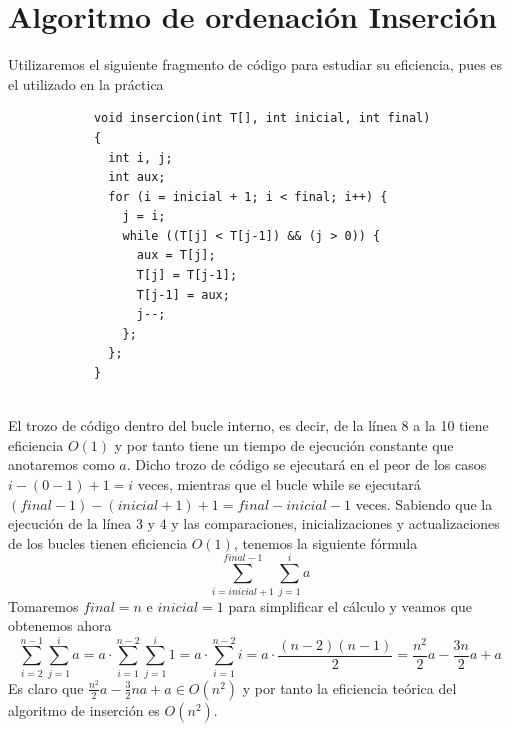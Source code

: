 \documentclass[11pt,openany]{book}
\begin{document}
\section*{Algoritmo de ordenación Inserción}
Utilizaremos el siguiente fragmento de código para estudiar su eficiencia, pues es el utilizado en la práctica
\begin{lstlisting}
            void insercion(int T[], int inicial, int final)
            {
              int i, j;
              int aux;
              for (i = inicial + 1; i < final; i++) {
                j = i;
                while ((T[j] < T[j-1]) && (j > 0)) {
                  aux = T[j];
                  T[j] = T[j-1];
                  T[j-1] = aux;
                  j--;
                };
              };
            }
            
        \end{lstlisting}
El trozo de código dentro del bucle interno, es decir, de la línea 8 a la 10 tiene eficiencia $O(1)$ y por tanto
tiene un tiempo de ejecución constante que anotaremos como $a$. Dicho trozo de código se ejecutará en el peor de los casos
$i-(0-1)+1=i$ veces, mientras que el bucle while se ejecutará $(final-1)-(inicial+1)+1=final-inicial-1$ veces.
Sabiendo que la ejecución de la línea 3 y 4 y las comparaciones, inicializaciones y actualizaciones de los bucles tienen eficiencia $O(1)$,
tenemos la siguiente fórmula
\begin{equation*}
    \sum_{i=inicial+1}^{final-1} \sum_{j=1}^{i}a
\end{equation*}
Tomaremos $final =  n$ e $inicial = 1$ para simplificar el cálculo y veamos que obtenemos ahora
\begin{equation*}
    \sum_{i=2}^{n-1} \sum_{j=1}^{i}a= a \cdot \sum_{i=1}^{n-2} \sum_{j=1}^{i}1= a \cdot \sum_{i=1}^{n-2} i
    = a \cdot \frac{(n-2)(n-1)}{2}=\frac{n^2}{2}a-\frac{3n}{2}a+a
\end{equation*}
Es claro que $\frac{n^2}{2}a-\frac{3}{2}na+a \in O(n^2)$ y por tanto la eficiencia teórica del algoritmo de inserción es $O(n^2)$.
\end{document}
